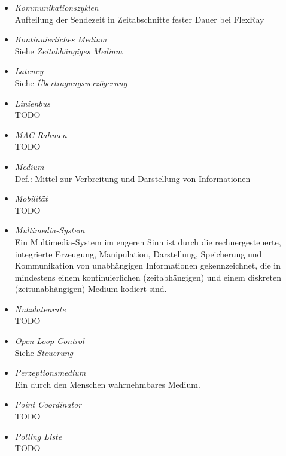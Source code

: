 \documentclass{article}
\begin{document}
\begin{itemize}
	\item \emph{Kommunikationszyklen}\\
		Aufteilung der Sendezeit in Zeitabschnitte fester Dauer bei FlexRay
	
	\item \emph{Kontinuierliches Medium}\\
		Siehe \emph{Zeitabhängiges Medium}

	\item \emph{Latency}\\
		Siehe \emph{Übertragungsverzögerung}

	\item \emph{Linienbus}\\
		TODO

	\item \emph{MAC-Rahmen}\\
		TODO

	\item \emph{Medium}\\
		Def.: Mittel zur Verbreitung und Darstellung von Informationen

	\item \emph{Mobilität}\\
		TODO

	\item \emph{Multimedia-System}\\
		Ein Multimedia-System im engeren Sinn ist durch die rechnergesteuerte, integrierte Erzeugung, Manipulation, Darstellung, Speicherung und Kommunikation von unabhängigen Informationen gekennzeichnet, die in mindestens einem kontinuierlichen (zeitabhängigen) und einem diskreten (zeitunabhängigen) Medium kodiert sind.

	\item \emph{Nutzdatenrate}\\
		TODO
	
	\item \emph{Open Loop Control}\\
		Siehe \emph{Steuerung}

	\item \emph{Perzeptionsmedium}\\
		Ein durch den Menschen wahrnehmbares Medium.

	\item \emph{Point Coordinator}\\
		TODO

	\item \emph{Polling Liste}\\
		TODO


\end{itemize}
\end{document}
